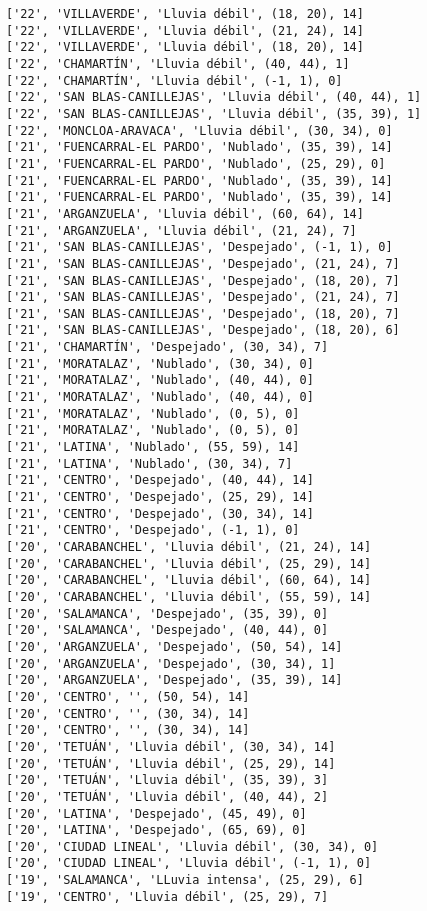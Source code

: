 \documentclass[11pt]{article}
\begin{document}
\begin{Verbatim}[commandchars=\\\{\}]
['22', 'VILLAVERDE', 'Lluvia débil', (18, 20), 14]
['22', 'VILLAVERDE', 'Lluvia débil', (21, 24), 14]
['22', 'VILLAVERDE', 'Lluvia débil', (18, 20), 14]
['22', 'CHAMARTÍN', 'Lluvia débil', (40, 44), 1]
['22', 'CHAMARTÍN', 'Lluvia débil', (-1, 1), 0]
['22', 'SAN BLAS-CANILLEJAS', 'Lluvia débil', (40, 44), 1]
['22', 'SAN BLAS-CANILLEJAS', 'Lluvia débil', (35, 39), 1]
['22', 'MONCLOA-ARAVACA', 'Lluvia débil', (30, 34), 0]
['21', 'FUENCARRAL-EL PARDO', 'Nublado', (35, 39), 14]
['21', 'FUENCARRAL-EL PARDO', 'Nublado', (25, 29), 0]
['21', 'FUENCARRAL-EL PARDO', 'Nublado', (35, 39), 14]
['21', 'FUENCARRAL-EL PARDO', 'Nublado', (35, 39), 14]
['21', 'ARGANZUELA', 'Lluvia débil', (60, 64), 14]
['21', 'ARGANZUELA', 'Lluvia débil', (21, 24), 7]
['21', 'SAN BLAS-CANILLEJAS', 'Despejado', (-1, 1), 0]
['21', 'SAN BLAS-CANILLEJAS', 'Despejado', (21, 24), 7]
['21', 'SAN BLAS-CANILLEJAS', 'Despejado', (18, 20), 7]
['21', 'SAN BLAS-CANILLEJAS', 'Despejado', (21, 24), 7]
['21', 'SAN BLAS-CANILLEJAS', 'Despejado', (18, 20), 7]
['21', 'SAN BLAS-CANILLEJAS', 'Despejado', (18, 20), 6]
['21', 'CHAMARTÍN', 'Despejado', (30, 34), 7]
['21', 'MORATALAZ', 'Nublado', (30, 34), 0]
['21', 'MORATALAZ', 'Nublado', (40, 44), 0]
['21', 'MORATALAZ', 'Nublado', (40, 44), 0]
['21', 'MORATALAZ', 'Nublado', (0, 5), 0]
['21', 'MORATALAZ', 'Nublado', (0, 5), 0]
['21', 'LATINA', 'Nublado', (55, 59), 14]
['21', 'LATINA', 'Nublado', (30, 34), 7]
['21', 'CENTRO', 'Despejado', (40, 44), 14]
['21', 'CENTRO', 'Despejado', (25, 29), 14]
['21', 'CENTRO', 'Despejado', (30, 34), 14]
['21', 'CENTRO', 'Despejado', (-1, 1), 0]
['20', 'CARABANCHEL', 'Lluvia débil', (21, 24), 14]
['20', 'CARABANCHEL', 'Lluvia débil', (25, 29), 14]
['20', 'CARABANCHEL', 'Lluvia débil', (60, 64), 14]
['20', 'CARABANCHEL', 'Lluvia débil', (55, 59), 14]
['20', 'SALAMANCA', 'Despejado', (35, 39), 0]
['20', 'SALAMANCA', 'Despejado', (40, 44), 0]
['20', 'ARGANZUELA', 'Despejado', (50, 54), 14]
['20', 'ARGANZUELA', 'Despejado', (30, 34), 1]
['20', 'ARGANZUELA', 'Despejado', (35, 39), 14]
['20', 'CENTRO', '', (50, 54), 14]
['20', 'CENTRO', '', (30, 34), 14]
['20', 'CENTRO', '', (30, 34), 14]
['20', 'TETUÁN', 'Lluvia débil', (30, 34), 14]
['20', 'TETUÁN', 'Lluvia débil', (25, 29), 14]
['20', 'TETUÁN', 'Lluvia débil', (35, 39), 3]
['20', 'TETUÁN', 'Lluvia débil', (40, 44), 2]
['20', 'LATINA', 'Despejado', (45, 49), 0]
['20', 'LATINA', 'Despejado', (65, 69), 0]
['20', 'CIUDAD LINEAL', 'Lluvia débil', (30, 34), 0]
['20', 'CIUDAD LINEAL', 'Lluvia débil', (-1, 1), 0]
['19', 'SALAMANCA', 'LLuvia intensa', (25, 29), 6]
['19', 'CENTRO', 'Lluvia débil', (25, 29), 7]

\end{Verbatim}
\end{document}
